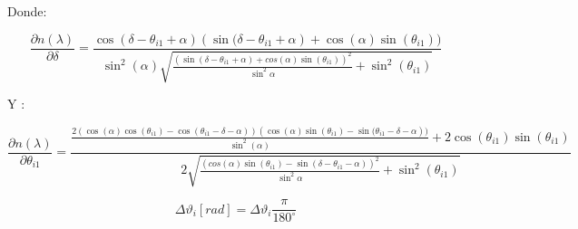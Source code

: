 \documentclass[article,12pt]{elsarticle}
\begin{document}
Donde:

\begin{mdframed}
\begin{equation}
\frac{\partial n(\lambda)}{\partial \delta} = \frac{\cos{(\delta-\theta_{i1}+\alpha)}(\sin{(\delta-\theta_{i1}+\alpha})+\cos{(\alpha)}\sin{(\theta_{i1})})}{\sin^2{(\alpha)}\sqrt{\frac{(\sin{(\delta-\theta_{i1}+\alpha)+cos(\alpha)\sin{(\theta_{i1})}})^2}{\sin^2{\alpha}}+\sin^2{(\theta_{i1})}}}
\end{equation}
\end{mdframed}

Y :

\begin{mdframed}
\begin{equation}
\frac{\partial n(\lambda)}{\partial \theta_{i1}} = \frac{\frac{2(\cos{(\alpha)}\cos{(\theta_{i1})}-\cos{(\theta_{i1}-\delta-\alpha)})(\cos{(\alpha)}\sin{(\theta_{i1})}-\sin{(\theta_{i1}-\delta-\alpha}))}{\sin^2{(\alpha)}}+2\cos{(\theta_{i1})}\sin{(\theta_{i1})}}{2\sqrt{\frac{(cos(\alpha)\sin{(\theta_{i1})}-\sin{(\delta-\theta_{i1}-\alpha)})^2}{\sin^2{\alpha}}+\sin^2{(\theta_{i1})}}}
\end{equation}
\end{mdframed}

\begin{mdframed}
\begin{equation}
  \Delta\vartheta_i[rad] = \Delta\vartheta_i \frac{\pi}{180^{\circ}} 
\end{equation}
\end{mdframed}
\end{document}
